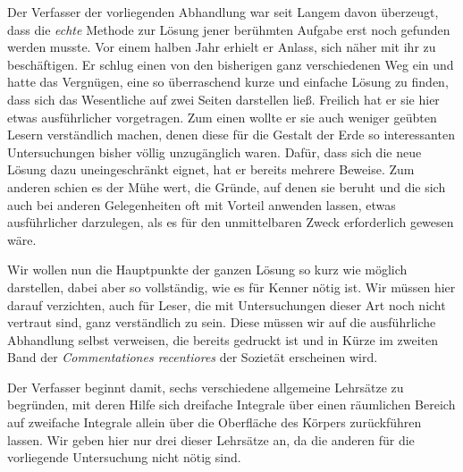 Der Verfasser der vorliegenden Abhandlung war seit Langem davon überzeugt, dass die \textit{echte} Methode zur Lösung jener berühmten Aufgabe erst noch gefunden werden musste. Vor einem halben Jahr erhielt er Anlass, sich näher mit ihr zu beschäftigen. Er schlug einen von den bisherigen ganz verschiedenen Weg ein und hatte das Vergnügen, eine so überraschend kurze und einfache Lösung zu finden, dass sich das Wesentliche auf zwei Seiten darstellen ließ. Freilich hat er sie hier etwas ausführlicher vorgetragen. Zum einen wollte er sie auch weniger geübten Lesern verständlich machen, denen diese für die Gestalt der Erde so interessanten Untersuchungen bisher völlig unzugänglich waren. Dafür, dass sich die neue Lösung dazu uneingeschränkt eignet, hat er bereits mehrere Beweise. Zum anderen schien es der Mühe wert, die Gründe, auf denen sie beruht und die sich auch bei anderen Gelegenheiten oft mit Vorteil anwenden lassen, etwas ausführlicher darzulegen, als es für den unmittelbaren Zweck erforderlich gewesen wäre.

Wir wollen nun die Hauptpunkte der ganzen Lösung so kurz wie möglich darstellen, dabei aber so vollständig, wie es für Kenner nötig ist. Wir müssen hier darauf verzichten, auch für Leser, die mit Untersuchungen dieser Art noch nicht vertraut sind, ganz verständlich zu sein. Diese müssen wir auf die ausführliche Abhandlung selbst verweisen, die bereits gedruckt ist und in Kürze im zweiten Band der \textit{Commentationes recentiores} der Sozietät erscheinen wird.

Der Verfasser beginnt damit, sechs verschiedene allgemeine Lehrsätze zu begründen, mit deren Hilfe sich dreifache Integrale über einen räumlichen Bereich auf zweifache Integrale allein über die Oberfläche des Körpers zurückführen lassen. Wir geben hier nur drei dieser Lehrsätze an, da die anderen für die vorliegende Untersuchung nicht nötig sind.

